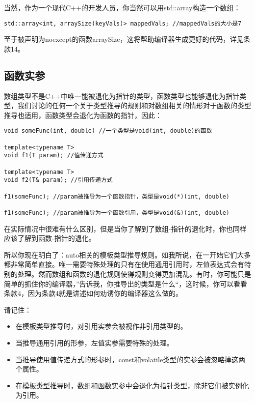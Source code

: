 当然，作为一个现代C++的开发人员，你当然可以用std::array构造一个数组：

\begin{lstlisting}
std::array<int, arraySize(keyVals)> mappedVals; //mappedVals的大小是7
\end{lstlisting}

至于被声明为noexcept的函数arraySize，这将帮助编译器生成更好的代码，详见条款14。

\subsection*{函数实参}
数组类型不是C++中唯一能被退化为指针的类型，函数类型也能够退化为指针类型，我们讨论的任何一个关于类型推导的规则和对数组相关的情形对于函数的类型推导也适用，函数类型会退化为函数的指针，因此：

\begin{lstlisting}
void someFunc(int, double) //一个类型是void(int, double)的函数

template<typename T>
void f1(T param); //值传递方式

template<typename T>
void f2(T& param); //引用传递方式

f1(someFunc); //param被推导为一个函数指针，类型是void(*)(int, double)

f1(someFunc); //param被推导为一个函数引用，类型是void(&)(int, double)
\end{lstlisting}

在实际情况中很难有什么区别，但是当你了解到了数组-指针的退化时，你也同样应该了解到函数-指针的退化。

所以你现在明白了：auto相关的模板类型推导规则。如我所说，在一开始它们大多都非常简单直接。唯一需要特殊处理的只有在使用通用引用时，左值表达式会有特别的处理。然而数组和函数的退化规则使得规则变得更加混乱。有时，你可能只是简单的抓住你的编译器，”告诉我，你推导出的类型是什么“，这时候，你可以看看条款4，因为条款4就是讲述如何劝诱你的编译器这么做的。

\begin{mdframed}
请记住：
\begin{itemize}
\item{在模板类型推导时，对引用实参会被视作非引用类型的。} 
\item{当推导通用引用的形参，左值实参需要特殊的处理。}
\item{当推导使用值传递方式的形参时，const和volatile类型的实参会被忽略掉这两个属性。}
\item{在模板类型推导时，数组和函数实参中会退化为指针类型，除非它们被实例化为引用。}
\end{itemize}
\end{mdframed}

